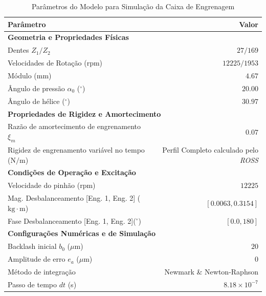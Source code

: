 \begin{table}[H]
	\centering
	\begin{threeparttable}
		\caption{Parâmetros do Modelo para  Simulação da Caixa de Engrenagem}
		\label{tab:replan_sim}
		
		\footnotesize %
		\renewcommand{\arraystretch}{1.2} %
		
		\begin{tabularx}{0.8\textwidth}{X r}
			\hline
			\textbf{Parâmetro} & \textbf{Valor} \\
			\hline
			\multicolumn{2}{l}{\textbf{Geometria e Propriedades Físicas}} \\
			\hline
			Dentes $Z_1/Z_2$ & $27 / 169$ \\
			Velocidades de Rotação (rpm) & $12225 / 1953$ \\
			Módulo (mm) & $4.67$ \\
			Ângulo de pressão $\alpha_0$ ($^\circ$) & $20.00$ \\
			Ângulo de hélice ($^\circ$) & $30.97$ \\
			\hline
			\multicolumn{2}{l}{\textbf{Propriedades de Rigidez e Amortecimento}} \\
			\hline
			Razão de amortecimento de engrenamento $\xi_m$ & $0.07$ \\
			Rigidez de engrenamento variável no tempo ($\mathrm{N/m}$) & Perfil Completo calculado pelo \textit{ROSS} \\
			\hline
			\multicolumn{2}{l}{\textbf{Condições de Operação e Excitação}} \\
			\hline
			Velocidade do pinhão (rpm) & $12225$ \\
			Mag. Desbalanceamento [Eng. 1, Eng. 2] ($\mathrm{kg\cdot m}$) & $[0.0063, 0.3154]$ \\
			Fase Desbalanceamento [Eng. 1, Eng. 2]($^\circ$) & $[0.0, 180]$ \\
			\hline
			\multicolumn{2}{l}{\textbf{Configurações Numéricas e de Simulação}} \\
			\hline
			Backlash inicial $b_0$ ($\mu$m) & $20$ \\
			Amplitude de erro $e_a$ ($\mu$m) & $0$ \\
			Método de integração & Newmark \& Newton-Raphson \\
			Passo de tempo $dt$ (s) & $8.18 \times 10^{-7}$ \\
			\hline
		\end{tabularx}
		

\end{threeparttable}
\end{table}

